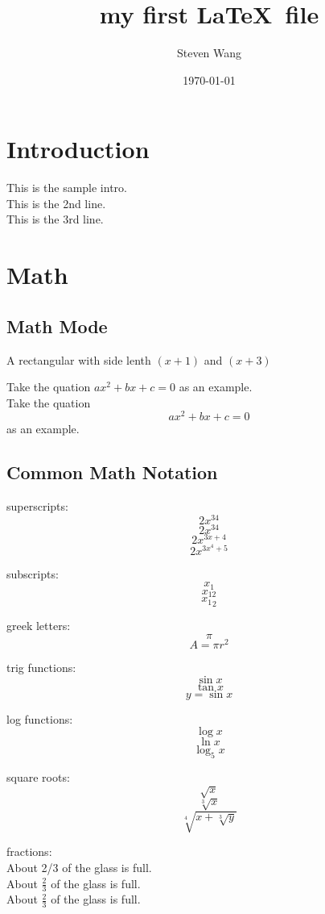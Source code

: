 \documentclass[12pt]{article}
\begin{document}
\title{my first \LaTeX \ file}
\author{Steven Wang}
\date{\today}
\maketitle

\tableofcontents

\section{Introduction}
This is the sample intro.\\
This is the 2nd line.\\
This is the 3rd line.\\


\section{Math}

\subsection{Math Mode}
A rectangular with side lenth $(x+1)$ and $(x+3)$

Take the quation $ax^2+bx+c=0$ as an example.\\
Take the quation $$ax^2+bx+c=0$$ as an example.

\subsection{Common Math Notation}
superscripts:
$$2x^34$$
$$2x^{34}$$
$$2x^{3x+4}$$
$$2x^{3x^4+5}$$

subscripts:
$$x_1$$
$$x_{12}$$
$${x_1}_2$$

greek letters:
$$\pi$$
$$A=\pi r^2$$

trig functions:
$$\sin{x}$$
$$\tan{x}$$
$$y=\sin{x}$$

log functions:
$$\log{x}$$
$$\ln{x}$$
$$\log_5{x}$$

square roots:
$$\sqrt{x}$$
$$\sqrt[3]{x}$$
$$\sqrt[4]{x+\sqrt[3]{y}}$$

fractions:\\
About 2/3 of the glass is full.\\
About $\frac{2}{3}$ of the glass is full.\\
About $\displaystyle{\frac{2}{3}}$ of the glass is full.
\end{document}
